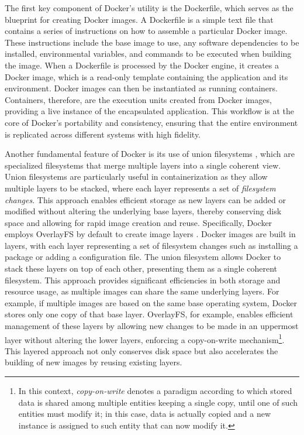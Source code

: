 The first key component of Docker's utility is the Dockerfile, which serves as the blueprint for creating Docker images. A Dockerfile is a simple text file that contains a series of instructions on how to assemble a particular Docker image. These instructions include the base image to use, any software dependencies to be installed, environmental variables, and commands to be executed when building the image. When a Dockerfile is processed by the Docker engine, it creates a Docker image, which is a read-only template containing the application and its environment. Docker images can then be instantiated as running containers. Containers, therefore, are the execution units created from Docker images, providing a live instance of the encapsulated application. This workflow is at the core of Docker's portability and consistency, ensuring that the entire environment is replicated across different systems with high fidelity.

Another fundamental feature of Docker is its use of union filesystems \cite{dua_performance_2016}, which are specialized filesystems that merge multiple layers into a single coherent view. Union filesystems are particularly useful in containerization as they allow multiple layers to be stacked, where each layer represents a set of \emph{filesystem changes}. This approach enables efficient storage as new layers can be added or modified without altering the underlying base layers, thereby conserving disk space and allowing for rapid image creation and reuse. Specifically, Docker employs OverlayFS by default to create image layers \cite{mizusawa_performance_2017}. Docker images are built in layers, with each layer representing a set of filesystem changes such as installing a package or adding a configuration file. The union filesystem allows Docker to stack these layers on top of each other, presenting them as a single coherent filesystem. This approach provides significant efficiencies in both storage and resource usage, as multiple images can share the same underlying layers. For example, if multiple images are based on the same base operating system, Docker stores only one copy of that base layer. OverlayFS, for example, enables efficient management of these layers by allowing new changes to be made in an uppermost layer without altering the lower layers, enforcing a copy-on-write mechanism\footnote{In this context, \emph{copy-on-write} denotes a paradigm according to which stored data is shared among multiple entities keeping a single copy, until one of such entities must modify it; in this case, data is actually copied and a new instance is assigned to such entity that can now modify it.}. This layered approach not only conserves disk space but also accelerates the building of new images by reusing existing layers.

